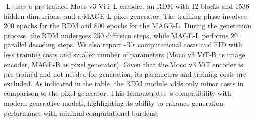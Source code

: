 \name-L~uses a pre-trained Moco v3 ViT-L encoder, an RDM with 12 blocks and 1536 hidden dimensions, and a MAGE-L pixel generator. The training phase involves 200 epochs for the RDM and 800 epochs for the MAGE-L. During the generation process, the RDM undergoes 250 diffusion steps, while MAGE-L performs 20 parallel decoding steps. We also report \name-B's computational costs and FID with less training costs and smaller number of parameters (Moco v3 ViT-B as image encoder, MAGE-B as pixel generator). Given that the Moco v3 ViT encoder is pre-trained and not needed for generation, its parameters and training costs are excluded. As indicated in the table, the RDM module adds only minor costs in comparison to the pixel generator. This demonstrates \name's compatibility with modern generative models, highlighting its ability to enhance generation performance with minimal computational burdens.

\begin{table}[t]
\caption{\textbf{Computational cost on ImageNet 256256}. \name~achieves a much smaller FID with similar or less computational cost as baseline methods.}
\vspace{-15pt}
\centering
\begin{center}{
}
\end{center}
\label{tab:computation} \vspace{-15pt}
\end{table}



